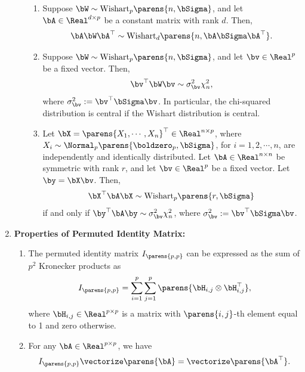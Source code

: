 \documentclass[12pt]{article}
\begin{document}
\begin{enumerate}[label=\textbf{\arabic*.}]
\begin{enumerate}
\begin{enumerate}
			\item Suppose $\bW \sim \mathrm{Wishart}_p \parens{n, \bSigma}$, and let $\bA \in \Real^{d \times p}$ be a constant matrix with rank $d$. Then, 
			\begin{align*}
				\bA \bW \bA^\top \sim \mathrm{Wishart}_d \parens{n, \bA \bSigma \bA^\top}. 
			\end{align*}
			
			\item Suppose $\bW \sim \mathrm{Wishart}_p \parens{n, \bSigma}$, and let $\bv \in \Real^p$ be a fixed vector. Then, 
			\begin{align*}
				\bv^\top \bW \bv \sim \sigma_{\bv}^2 \chi_n^2, 
			\end{align*}
			where $\sigma_{\bv}^2 := \bv^\top \bSigma \bv$. In particular, the chi-squared distribution is central if the Wishart distribution is central. 
			
			\item Let $\bX = \parens{X_1, \cdots, X_n}^\top \in \Real^{n \times p}$, where $X_i \sim \Normal_p \parens{\boldzero_p, \bSigma}$, for $i = 1, 2, \cdots, n$, are independently and identically distributed. Let $\bA \in \Real^{n \times n}$ be symmetric with rank $r$, and let $\bv \in \Real^p$ be a fixed vector. Let $\by = \bX \bv$. Then, 
			\begin{align*}
				\bX^\top \bA \bX \sim \mathrm{Wishart}_p \parens{r, \bSigma}
			\end{align*}
			if and only if $\by^\top \bA \by \sim \sigma_{\bv}^2 \chi_n^2$, where $\sigma_{\bv}^2 := \bv^\top \bSigma \bv$. 
		\end{enumerate}
		
	\end{enumerate}
	
	\item \textbf{Properties of Permuted Identity Matrix:} 
	\begin{enumerate}
		\item The permuted identity matrix $I_{\parens{p, p}}$ can be expressed as the sum of $p^2$ Kronecker products as 
		\begin{align*}
			I_{\parens{p, p}} = \sum_{i=1}^p \sum_{j=1}^p \parens{\bH_{i,j} \otimes \bH_{i,j}^\top}, 
		\end{align*}
		where $\bH_{i,j} \in \Real^{p \times p}$ is a matrix with $\parens{i,j}$-th element equal to 1 and zero otherwise. 
		
		\item For any $\bA \in \Real^{p \times p}$, we have 
		\begin{align*}
			I_{\parens{p, p}} \vectorize \parens{\bA} = \vectorize \parens{\bA^\top}. 
		\end{align*}
	\end{enumerate}

\end{enumerate}
\end{document}
